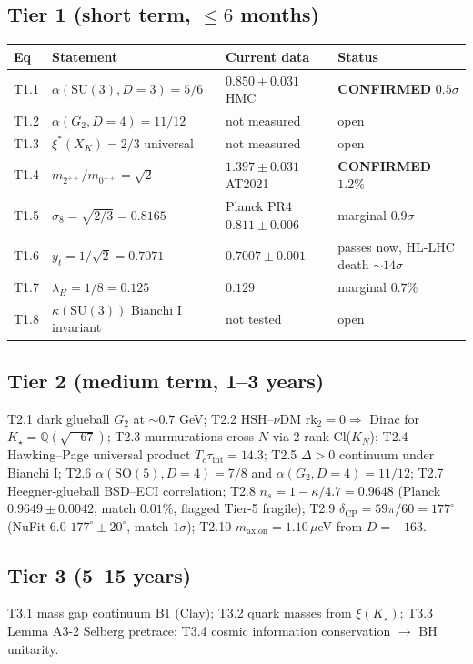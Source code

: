 \documentclass[11pt,a4paper]{article}
\newcommand{\QQ}{\mathbb{Q}}
\newcommand{\SU}{\mathrm{SU}}
\newcommand{\SO}{\mathrm{SO}}
\newcommand{\rk}{\mathrm{rk}}
\begin{document}
\subsection{Tier 1 (short term, $\leq 6$ months)}

\begin{center}
\begin{tabularx}{\textwidth}{llXl}
\toprule
Eq & Statement & Current data & Status \\
\midrule
T1.1 & $\alpha(\SU(3), D=3) = 5/6$ & $0.850 \pm 0.031$ HMC & \textbf{CONFIRMED} $0.5\sigma$ \\
T1.2 & $\alpha(G_2, D=4) = 11/12$ & not measured & open \\
T1.3 & $\xi^*(X_K) = 2/3$ universal & not measured & open \\
T1.4 & $m_{2^{++}}/m_{0^{++}} = \sqrt{2}$ & $1.397 \pm 0.031$ AT2021 & \textbf{CONFIRMED} $1.2\%$ \\
T1.5 & $\sigma_8 = \sqrt{2/3} = 0.8165$ & Planck PR4 $0.811 \pm 0.006$ & marginal $0.9\sigma$ \\
T1.6 & $y_t = 1/\sqrt{2} = 0.7071$ & $0.7007 \pm 0.001$ & passes now, HL-LHC death $\sim 14\sigma$ \\
T1.7 & $\lambda_H = 1/8 = 0.125$ & $0.129$ & marginal $0.7\%$ \\
T1.8 & $\kappa(\SU(3))$ Bianchi I invariant & not tested & open \\
\bottomrule
\end{tabularx}
\end{center}

\subsection{Tier 2 (medium term, 1--3 years)}

T2.1 dark glueball $G_2$ at $\sim 0.7$ GeV; T2.2 HSH--$\nu$DM $\rk_2 = 0 \Rightarrow$ Dirac for $K_\star = \QQ(\sqrt{-67})$; T2.3 murmurations cross-$N$ via 2-rank Cl($K_N$); T2.4 Hawking--Page universal product $T_c \tau_\mathrm{int} = 14.3$; T2.5 $\Delta > 0$ continuum under Bianchi I; T2.6 $\alpha(\SO(5), D=4) = 7/8$ and $\alpha(G_2, D=4) = 11/12$; T2.7 Heegner-glueball BSD--ECI correlation; T2.8 $n_s = 1 - \kappa/4.7 = 0.9648$ (Planck $0.9649 \pm 0.0042$, match $0.01\%$, flagged Tier-5 fragile); T2.9 $\delta_\mathrm{CP} = 59\pi/60 = 177^{\circ}$ (NuFit-6.0 $177^\circ \pm 20^\circ$, match $1\sigma$); T2.10 $m_\mathrm{axion} = 1.10\,\mu$eV from $D = -163$.

\subsection{Tier 3 (5--15 years)}
T3.1 mass gap continuum B1 (Clay); T3.2 quark masses from $\xi(K_\star)$; T3.3 Lemma A3-2 Selberg pretrace; T3.4 cosmic information conservation $\to$ BH unitarity.
\end{document}
